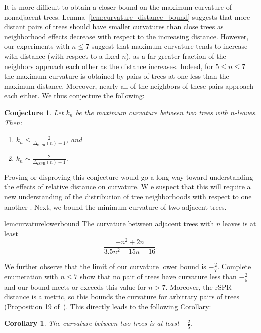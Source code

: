 \documentclass[10pt,twoside,leqno,twocolumn]{article}
\newtheorem{cor}[thm]{Corollary}
\newtheorem{conj}[thm]{Conjecture}
\newcommand{\cuttable}[2][]{%
    \ifthenelse{\equal{#1}{}}%
		{}%
		{#1}%
}
\begin{document}
It is more difficult to obtain a closer bound on the maximum curvature of nonadjacent trees.
Lemma~\ref{lem:curvature_distance_bound} suggests that more distant pairs of trees should have smaller curvatures than close trees as neighborhood effects decrease with respect to the increasing distance.
However, our experiments with $n \le 7$ suggest that maximum curvature tends to increase with distance (with respect to a fixed $n$), as a far greater fraction of the neighbors approach each other as the distance increases.
Indeed, for $5 \le n \le 7$ the maximum curvature is obtained by pairs of trees at one less than the maximum distance.
Moreover, nearly all of the neighbors of these pairs approach each either.
We thus conjecture the following:
\begin{conj}
	Let $k_n$ be the maximum curvature between two trees with $n$-leaves.
	Then:
	\begin{enumerate}
		\item $k_n \le \frac{2}{\Delta_{\text{rSPR}}(n)-1}$, and
		\item $ k_n \sim \frac{2}{\Delta_{\text{rSPR}}(n)-1}$.
	\end{enumerate}
\end{conj}
Proving or disproving this conjecture would go a long way toward understanding the effects of relative distance on curvature.
\cuttable[W]{However, w}e suspect that this will require a \cuttable[new]{greater} understanding of the distribution of tree neighborhoods with respect to one another\cuttable{ than is currently known}.
Next, we bound the minimum curvature of two adjacent trees.

\begin{restatable}{lem}{curvaturelowerbound}
\label{lem:curvature_lower_bound}
	The curvature between adjacent trees with $n$ leaves is at least
	$$\frac{-n^2 + 2n}{3.5n^2 - 15n + 16}.$$
\end{restatable}

We further observe that the limit of our curvature lower bound is $-\frac{2}{7}$.
Complete enumeration with $n \le 7$ show that no pair of trees have curvature less than $-\frac{2}{5}$ and our bound meets or exceeds this value for $n > 7$.
Moreover, the rSPR distance is a metric, so this bounds the curvature for arbitrary pairs of trees (Proposition 19 of~\cite{Ollivier2009-bw}).
This directly leads to the following Corollary:

\begin{cor}
	The curvature between two trees is at least $-\frac{2}{5}$.
\end{cor}
\end{document}
